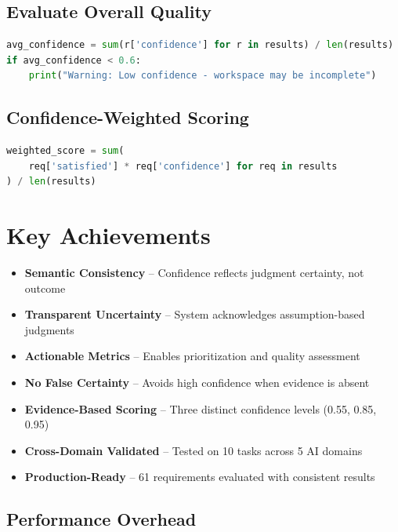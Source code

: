 \documentclass[11pt,a4paper]{article}
\begin{document}
\subsection{Evaluate Overall Quality}

\begin{lstlisting}[language=Python, caption={Calculate Average Confidence}]
avg_confidence = sum(r['confidence'] for r in results) / len(results)
if avg_confidence < 0.6:
    print("Warning: Low confidence - workspace may be incomplete")
\end{lstlisting}

\subsection{Confidence-Weighted Scoring}

\begin{lstlisting}[language=Python, caption={Weight Scores by Confidence}]
weighted_score = sum(
    req['satisfied'] * req['confidence'] for req in results
) / len(results)
\end{lstlisting}

\section{Key Achievements}

\begin{itemize}[leftmargin=*]
    \item[\checkmark] \textbf{Semantic Consistency} -- Confidence reflects judgment certainty, not outcome
    \item[\checkmark] \textbf{Transparent Uncertainty} -- System acknowledges assumption-based judgments
    \item[\checkmark] \textbf{Actionable Metrics} -- Enables prioritization and quality assessment
    \item[\checkmark] \textbf{No False Certainty} -- Avoids high confidence when evidence is absent
    \item[\checkmark] \textbf{Evidence-Based Scoring} -- Three distinct confidence levels (0.55, 0.85, 0.95)
    \item[\checkmark] \textbf{Cross-Domain Validated} -- Tested on 10 tasks across 5 AI domains
    \item[\checkmark] \textbf{Production-Ready} -- 61 requirements evaluated with consistent results
\end{itemize}

\subsection{Performance Overhead}
\end{document}
